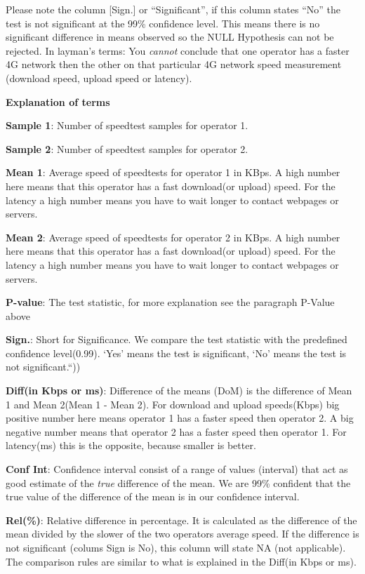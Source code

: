 \documentclass[]{article}
\begin{document}
Please note the column {[}Sign.{]} or ``Significant'', if this column
states ``No'' the test is not significant at the 99\% confidence level.
This means there is no significant difference in means observed so the
NULL Hypothesis can not be rejected. In layman's terms: You
\emph{cannot} conclude that one operator has a faster 4G network then
the other on that particular 4G network speed measurement (download
speed, upload speed or latency).

\textbf{Explanation of terms}

\footnotesize

\textbf{Sample 1}: Number of speedtest samples for operator 1.

\textbf{Sample 2}: Number of speedtest samples for operator 2.

\textbf{Mean 1}: Average speed of speedtests for operator 1 in KBps. A
high number here means that this operator has a fast download(or upload)
speed. For the latency a high number means you have to wait longer to
contact webpages or servers.

\textbf{Mean 2}: Average speed of speedtests for operator 2 in KBps. A
high number here means that this operator has a fast download(or upload)
speed. For the latency a high number means you have to wait longer to
contact webpages or servers.

\textbf{P-value}: The test statistic, for more explanation see the
paragraph P-Value above

\textbf{Sign.}: Short for Significance. We compare the test statistic
with the predefined confidence level(0.99). `Yes' means the test is
significant, `No' means the test is not significant.``))

\textbf{Diff(in Kbps or ms)}: Difference of the means (DoM) is the
difference of Mean 1 and Mean 2(Mean 1 - Mean 2). For download and
upload speeds(Kbps) big positive number here means operator 1 has a
faster speed then operator 2. A big negative number means that operator
2 has a faster speed then operator 1. For latency(ms) this is the
opposite, because smaller is better.

\textbf{Conf Int}: Confidence interval consist of a range of values
(interval) that act as good estimate of the \emph{true} difference of
the mean. We are 99\% confident that the true value of the difference of
the mean is in our confidence interval.

\textbf{Rel(\%)}: Relative difference in percentage. It is calculated as
the difference of the mean divided by the slower of the two operators
average speed. If the difference is not significant (colums Sign is No),
this column will state NA (not applicable). The comparison rules are
similar to what is explained in the Diff(in Kbps or ms).
\end{document}
